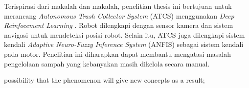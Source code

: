  Terispirasi dari makalah \cite{Bai2018} dan makalah\cite{Kong2009,Michael2008,Wang2008,Arai2019}, penelitian thesis ini bertujuan untuk merancang \textit{Autonomous Trash Collector System} (ATCS) menggunakan \textit{Deep Reinfocement Learning}  \cite{Mustafa2019}. Robot dilengkapi dengan sensor kamera dan sistem navigasi untuk mendeteksi posisi robot. Selain itu, ATCS juga dilengkapi sistem kendali \textit{Adaptive Neuro-Fuzzy Inference System} (ANFIS) sebagai sistem kendali pada motor\cite{Saputra2019}. Penelitian ini diharapkan dapat membantu mengatasi masalah pengelolaan sampah yang kebanyakan masih dikelola secara manual.




possibility that the phenomenon will give new concepts as a result; 







